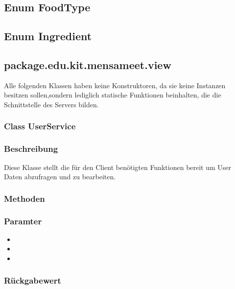 \documentclass[a4paper]{scrreprt}
\begin{document}
\subsection{Enum FoodType}

\subsection{Enum Ingredient}



\subsection{package.edu.kit.mensameet.view}

Alle folgenden Klassen haben keine Konstruktoren, da sie keine Instanzen besitzen sollen,sondern lediglich statische Funktionen beinhalten, die die Schnittstelle des Servers bilden.

\subsubsection{Class UserService}
\subsubsection*{Beschreibung}
Diese Klasse stellt die für den Client benötigten Funktionen bereit um User Daten abzufragen und zu bearbeiten. 

\subsubsection*{Methoden}
\begin{addmargin}[25pt]{0pt}

\subsubsection*{Paramter}
\begin{itemize}
\item
\item
\item
\end{itemize}

\subsubsection*{Rückgabewert}
\end{addmargin}
\end{document}
